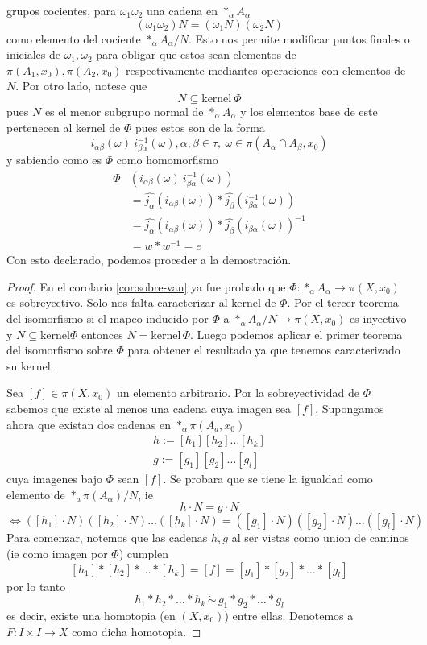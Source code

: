 grupos cocientes, para \(\omega_1 \omega_2 \) una cadena en \(*_\alpha
A_\alpha\)
\[ (\omega_1 \omega_2) N = (\omega_1 N) (\omega_2 N) \]
como elemento del cociente \(*_\alpha A_\alpha / N\). Esto nos permite
modificar puntos finales o iniciales de \(\omega_1, \omega_2\) para
obligar que estos sean elementos de \(\pi (A_1, x_0), \pi (A_2, x_0)\)
respectivamente mediantes operaciones con elementos de \(N\). Por otro
lado, notese que
\[ N \subseteq \text{kernel} \ \Phi \]
pues \(N\) es el menor subgrupo normal de \(*_\alpha A_\alpha\) y los
elementos base de este pertenecen al kernel de \(\Phi\) pues estos son
de la forma
\[ i_{\alpha \beta} (\omega) \ i_{\beta \alpha}^{-1} (\omega) ,
  \alpha,\beta \in \tau,\ \omega \in \pi(A_\alpha \cap A_\beta , x_0)\]
y sabiendo como es \(\Phi\) como homomorfismo
\begin{align*}
  \Phi &\left( i_{\alpha \beta} (\omega) \ i_{\beta \alpha}^{-1} (\omega) \right) \\
       &= \hat {j_\alpha} \left(  i_{\alpha \beta} (\omega) \right) * \hat {j_\beta} \left( i_{\beta \alpha}^{-1} (\omega) \right) \\
       &= \hat {j_\alpha} \left(  i_{\alpha \beta} (\omega) \right) * \hat {j_\beta} \left( i_{\beta \alpha} (\omega) \right)^{-1} \\
       &= w * w^{-1} = e
\end{align*}
Con esto
declarado, podemos proceder a la demostración.
\begin{proof}
  En el corolario \ref{cor:sobre-van} ya fue probado que \(\Phi :
  *_\alpha A_\alpha \to \pi (X, x_0)\) es sobreyectivo. Solo nos falta
  caracterizar al kernel de \(\Phi\). Por el tercer teorema del
  isomorfismo
  si el mapeo inducido por \(\Phi\) a \(*_\alpha A_\alpha / N \to \pi (X,
  x_0)\) es inyectivo y \(N \subseteq \text{kernel} \Phi\) entonces \(N =
  \text{kernel} \, \Phi\). Luego podemos aplicar el primer teorema del
  isomorfismo sobre \(\Phi\) para obtener el resultado ya que tenemos
  caracterizado su kernel.

  Sea \([f] \in \pi (X, x_0)\) un elemento arbitrario. Por la
  sobreyectividad de \(\Phi\) sabemos que existe al menos una cadena
  cuya imagen sea \([f]\). Supongamos ahora que existan dos cadenas en
  \(*_\alpha \pi (A_a, x_0)\)
  \begin{gather*}
    h := [h_1][h_2]\dotsc [h_k] \\
    g := [g _1][g _2]\dotsc [g _l]
  \end{gather*}
  cuya imagenes bajo \(\Phi\) sean \([f]\). Se probara que se tiene la
  igualdad como elemento de \(*_a \pi (A_\alpha) / N\), ie
  \[ h \cdot N = g\cdot N\]
  \[ \iff ([h_1]\cdot N) ([h_2] \cdot N) \dotsc ([h_k] \cdot N) = ([g _1] \cdot
    N) ([g _2] \cdot N) \dotsc ([g _l] \cdot N) \]
  Para comenzar, notemos que las cadenas \(h,g\) al ser vistas como
  union de caminos (ie como imagen por \(\Phi\)) cumplen
  \[ [h_1] * [h_2] * \dotsc * [h_k] = [f] = [g _1] * [g _2] * \dotsc * [g _l] \]
  por lo tanto
  \[ h_1 * h_2 * \dotsc * h_k \, \dot \sim \, g _1 * g _2 * \dotsc *
    g _l \]
  es decir, existe una homotopia (en \((X,x_0)\)) entre ellas. Denotemos
  a \(F : I \times I \to X\) como dicha homotopia.
\end{proof}
